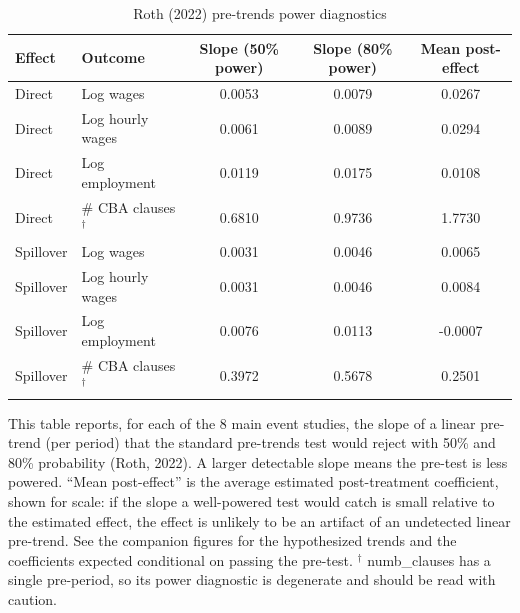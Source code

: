 \begin{table}[H]
\centering
\scriptsize
\caption{Roth (2022) pre-trends power diagnostics}
\label{tab:pretrends_slopes}
\begin{tabular}{llccc}
\hline\hline
Effect & Outcome & Slope (50\% power) & Slope (80\% power) & Mean post-effect \\
\hline
Direct & Log wages & 0.0053 & 0.0079 & 0.0267 \\
Direct & Log hourly wages & 0.0061 & 0.0089 & 0.0294 \\
Direct & Log employment & 0.0119 & 0.0175 & 0.0108 \\
Direct & # CBA clauses$^{\dagger}$ & 0.6810 & 0.9736 & 1.7730 \\
\hline
Spillover & Log wages & 0.0031 & 0.0046 & 0.0065 \\
Spillover & Log hourly wages & 0.0031 & 0.0046 & 0.0084 \\
Spillover & Log employment & 0.0076 & 0.0113 & -0.0007 \\
Spillover & # CBA clauses$^{\dagger}$ & 0.3972 & 0.5678 & 0.2501 \\
\hline
\end{tabular}
\begin{minipage}{0.92\textwidth}\scriptsize This table reports, for each of the 8 main event studies, the slope of a linear pre-trend (per period) that the standard pre-trends test would reject with 50\% and 80\% probability (Roth, 2022). A larger detectable slope means the pre-test is less powered. ``Mean post-effect'' is the average estimated post-treatment coefficient, shown for scale: if the slope a well-powered test would catch is small relative to the estimated effect, the effect is unlikely to be an artifact of an undetected linear pre-trend. See the companion figures for the hypothesized trends and the coefficients expected conditional on passing the pre-test. $^{\dagger}$ numb\_clauses has a single pre-period, so its power diagnostic is degenerate and should be read with caution.\end{minipage}
\end{table}